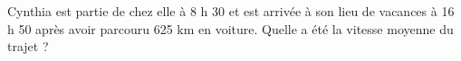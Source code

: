 
\begin{exercice}\label{exosmath-0952}

Cynthia est partie de chez elle à 8 h 30 et est arrivée à son lieu de vacances à 16 h 50 après avoir parcouru 625 km en voiture.  Quelle a été la vitesse moyenne du trajet ?

\end{exercice}
